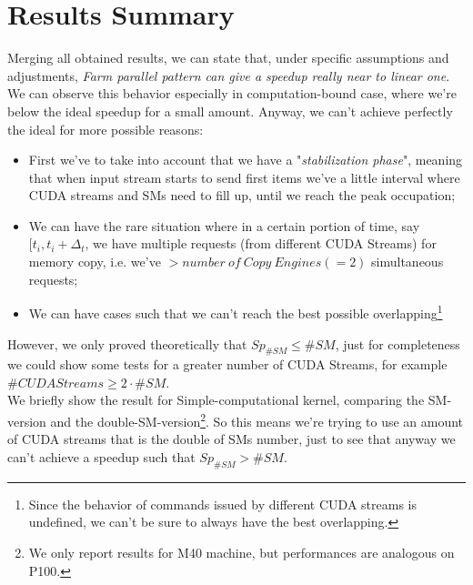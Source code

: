 \section{Results Summary}
Merging all obtained results, we can state that, under specific assumptions and adjustments, \textit{Farm parallel pattern can give a speedup really near to linear one}.\\
We can observe this behavior especially in computation-bound case, where we're below the ideal speedup for a small amount. Anyway, we can't achieve perfectly the ideal for more possible reasons: 
\begin{itemize}
	\item First we've to take into account that we have a "\textit{stabilization phase}", meaning that when input stream starts to send first items we've a little interval where CUDA streams and SMs need to fill up, until we reach the peak occupation;
	\item We can have the rare situation where in a certain portion of time, say \([t_{i},t_{i}+\Delta_{t}\), we have multiple requests (from different CUDA Streams) for memory copy, i.e. we've \(> number \ of \ Copy \ Engines (=2)\) simultaneous requests;
	\item We can have cases such that we can't reach the best possible overlapping\footnote{Since the behavior of commands issued by different CUDA streams is undefined, we can't be sure to always have the best overlapping.}
\end{itemize}
However, we only proved theoretically that \(Sp_{\#SM} \leq \#SM\), just for completeness we could show some tests for a greater number of CUDA Streams, for example\\ \(\#CUDA Streams \geq 2\cdot\#SM\).\\
We briefly show the result for Simple-computational kernel, comparing the SM-version and the double-SM-version\footnote{We only report results for M40 machine, but performances are analogous on P100.}.
So this means we're trying to use an amount of CUDA streams that is the double of SMs number, just to see that anyway we can't achieve a speedup such that \(Sp_{\#SM} > \#SM\).



